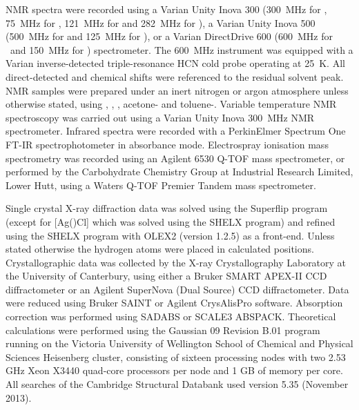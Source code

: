 NMR spectra were recorded using a Varian Unity Inova 300 (300~MHz for \proton, 75~MHz for \carbon, 121~MHz for \phosphorus{} and 282~MHz for \fluorine), a Varian Unity Inova 500 (500~MHz for \proton{} and 125~MHz for \carbon), or a Varian DirectDrive 600 (600~MHz for \proton\ and 150~MHz for \carbon{}) spectrometer.   The 600~MHz instrument was equipped with a Varian inverse-detected triple-resonance HCN cold probe operating at 25~K.  All direct-detected \proton{} and \carbon{} chemical shifts were referenced to the residual solvent peak.\cite{Fulmer2010}  NMR samples were prepared under an inert nitrogen or argon atmosphere unless otherwise stated, using , , , acetone- and toluene-.  Variable temperature NMR spectroscopy was carried out using a Varian Unity Inova 300~MHz NMR spectrometer.  Infrared spectra were recorded with a PerkinElmer Spectrum One FT-IR spectrophotometer in absorbance mode.  Electrospray ionisation mass spectrometry was recorded using an Agilent 6530 Q-TOF mass spectrometer, or performed by the Carbohydrate Chemistry Group at Industrial Research Limited, Lower Hutt, using a Waters Q-TOF Premier Tandem mass spectrometer.

Single crystal X-ray diffraction data was solved using the Superflip program\cite{Superflip} (except for [Ag(\tButhixantphos)Cl] which was solved using the SHELX program) and refined using the SHELX program\cite{Shelx} with OLEX2 (version 1.2.5)\cite{Olex2} as a front-end.  Unless stated otherwise the hydrogen atoms were placed in calculated positions.  Crystallographic data was collected by the X-ray Crystallography Laboratory at the University of Canterbury, using either a Bruker SMART APEX-II CCD diffractometer or an Agilent SuperNova (Dual Source) CCD diffractometer.  Data were reduced using Bruker SAINT or Agilent CrysAlisPro software.  Absorption correction was performed using SADABS or SCALE3 ABSPACK.  Theoretical calculations were performed using the Gaussian 09 Revision B.01 program\cite{Gaussian09, Gaussian09b} running on the Victoria University of Wellington School of Chemical and Physical Sciences Heisenberg cluster, consisting of sixteen processing nodes with two 2.53 GHz Xeon X3440 quad-core processors per node and 1 GB of memory per core.  All searches of the Cambridge Structural Databank used version 5.35 (November 2013).\cite{Allen2002} 



